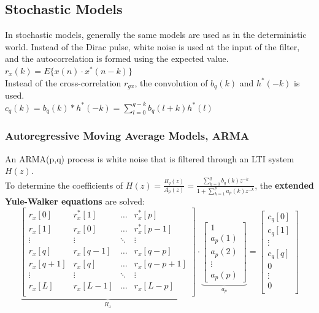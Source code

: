 \subsection{Stochastic Models}
In stochastic models, generally the same models are used as in the deterministic world.
Instead of the Dirac pulse, white noise is used at the input of the filter, and the autocorrelation is formed using the expected value.
$r_x(k)=E\{x(n) \cdot x^*(n-k)\}$\\
Instead of the cross-correlation $r_{gx}$, the convolution of $b_q(k)$ and $h^*(-k)$ is used.\\
$c_q(k) = b_q(k) \ast h^*(-k) = \sum_{l=0}^{q-k} b_q(l+k) h^*(l)$

\subsubsection{Autoregressive Moving Average Models, ARMA }
An ARMA(p,q) process is white noise that is filtered through an LTI system $H(z)$.\\
To determine the coefficients of $H(z)=\frac{B_q(z)}{A_p(z)}=\frac{\sum\limits_{k=0}^q b_q(k)z^{-k}}{1+\sum\limits_{k=1}^p a_p(k)z^{-k}}$, the \textbf{extended Yule-Walker equations} are solved:
\small$$
\underbrace{\begin{bmatrix}               
			r_x[0] & r_x^*[1] & \hdots & r_x^*[p] \\   
			r_x[1] & r_x[0] & \hdots & r_x^*[p-1] \\   
			\vdots & \vdots & \ddots & \vdots \\     
			r_x[q] & r_x[q-1] & \hdots & r_x[q-p] \\   
			r_x[q+1] & r_x[q] & \hdots & r_x[q-p+1] \\    
			\vdots & \vdots & \ddots & \vdots \\     
			r_x[L] & r_x[L-1] & \hdots & r_x[L-p] \\ 
		\end{bmatrix}  }_{R_x} \cdot \underbrace{\begin{bmatrix}
			1\\
			a_p(1) \\
			a_p(2) \\
			\vdots \\
			a_p(p)
		\end{bmatrix}  }_{a_p}= \begin{bmatrix}
				c_q[0]\\            
				c_q[1]\\
			\vdots \\
				c_q[q]\\
				0\\
			\vdots \\
				0\\
		\end{bmatrix} 
			$$ \normalsize

